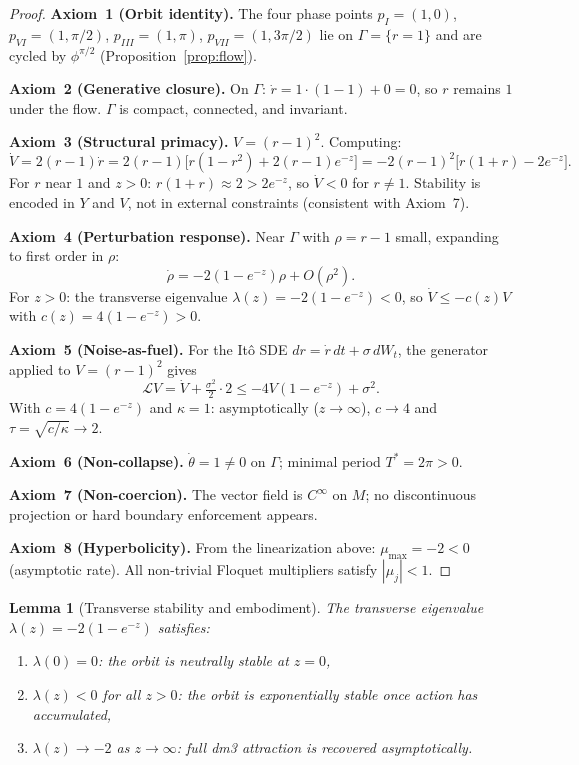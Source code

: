 \documentclass[reqno]{amsart}
\numberwithin{equation}{section}
\theoremstyle{plain}
\newtheorem{lemma}[theorem]{Lemma}
\theoremstyle{definition}
\theoremstyle{remark}
\newcommand{\Orb}{\Gamma}
\newcommand{\cL}{\mathcal{L}}
\begin{document}
\begin{proof}
\textbf{Axiom~1 (Orbit identity).}
The four phase points $p_I=(1,0)$, $p_{VI}=(1,\pi/2)$,
$p_{III}=(1,\pi)$, $p_{VII}=(1,3\pi/2)$ lie on $\Orb=\{r=1\}$
and are cycled by $\phi^{\pi/2}$ (Proposition~\ref{prop:flow}).

\textbf{Axiom~2 (Generative closure).}
On $\Orb$: $\dot r = 1\cdot(1-1)+0=0$, so $r$ remains $1$
under the flow. $\Orb$ is compact, connected, and invariant.

\textbf{Axiom~3 (Structural primacy).}
$V=(r-1)^2$. Computing:
\[
  \dot V = 2(r-1)\dot r
  = 2(r-1)\bigl[r(1-r^2)+2(r-1)e^{-z}\bigr]
  = -2(r-1)^2\bigl[r(1+r)-2e^{-z}\bigr].
\]
For $r$ near $1$ and $z>0$: $r(1+r)\approx 2>2e^{-z}$,
so $\dot V<0$ for $r\ne 1$. Stability is encoded in $Y$ and $V$,
not in external constraints (consistent with Axiom~7).

\textbf{Axiom~4 (Perturbation response).}
Near $\Orb$ with $\rho=r-1$ small, expanding to first order in
$\rho$:
\[
  \dot\rho = -2(1-e^{-z})\rho + O(\rho^2).
\]
For $z>0$: the transverse eigenvalue
$\lambda(z)=-2(1-e^{-z})<0$, so $\dot V\le -c(z)V$ with
$c(z)=4(1-e^{-z})>0$.

\textbf{Axiom~5 (Noise-as-fuel).}
For the It\^{o} SDE $dr=\dot r\,dt+\sigma\,dW_t$, the generator
applied to $V=(r-1)^2$ gives
\[
  \cL V = \dot V + \tfrac{\sigma^2}{2}\cdot 2
  \le -4V(1-e^{-z}) + \sigma^2.
\]
With $c=4(1-e^{-z})$ and $\kappa=1$: asymptotically ($z\to\infty$),
$c\to 4$ and $\tau=\sqrt{c/\kappa}\to 2$.

\textbf{Axiom~6 (Non-collapse).}
$\dot\theta=1\ne 0$ on $\Orb$; minimal period $T^*=2\pi>0$.

\textbf{Axiom~7 (Non-coercion).}
The vector field is $C^\infty$ on $M$; no discontinuous
projection or hard boundary enforcement appears.

\textbf{Axiom~8 (Hyperbolicity).}
From the linearization above: $\mu_{\max}=-2<0$ (asymptotic
rate). All non-trivial Floquet multipliers satisfy $|\mu_j|<1$.
\end{proof}

\begin{lemma}[Transverse stability and embodiment]\label{lem:transverse}
The transverse eigenvalue $\lambda(z)=-2(1-e^{-z})$ satisfies:
\begin{enumerate}[label=\textup{(\roman*)}]
  \item $\lambda(0)=0$: the orbit is neutrally stable at $z=0$,
  \item $\lambda(z)<0$ for all $z>0$: the orbit is exponentially
        stable once action has accumulated,
  \item $\lambda(z)\to -2$ as $z\to\infty$: full dm3 attraction
        is recovered asymptotically.
\end{enumerate}
\end{lemma}
\end{document}
